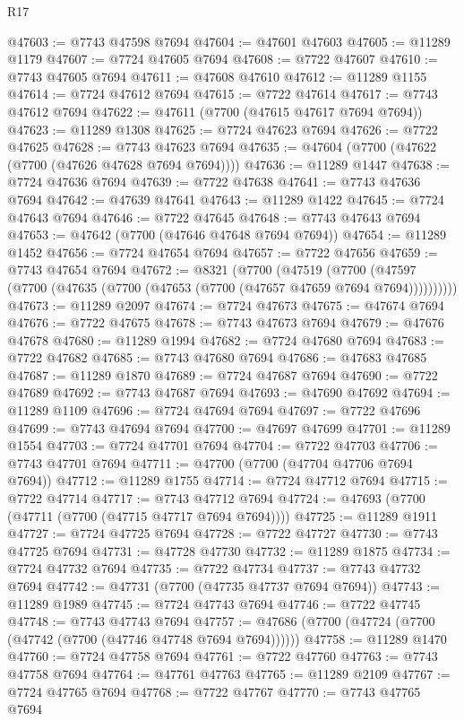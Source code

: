 \begin{lexlean}{R17}
\begin{coremodule}
@47603 := @7743 @47598 @7694
@47604 := @47601 @47603
@47605 := @11289 @1179
@47607 := @7724 @47605 @7694
@47608 := @7722 @47607
@47610 := @7743 @47605 @7694
@47611 := @47608 @47610
@47612 := @11289 @1155
@47614 := @7724 @47612 @7694
@47615 := @7722 @47614
@47617 := @7743 @47612 @7694
@47622 := @47611 (@7700 (@47615 @47617 @7694 @7694))
@47623 := @11289 @1308
@47625 := @7724 @47623 @7694
@47626 := @7722 @47625
@47628 := @7743 @47623 @7694
@47635 := @47604 (@7700 (@47622 (@7700 (@47626 @47628 @7694 @7694))))
@47636 := @11289 @1447
@47638 := @7724 @47636 @7694
@47639 := @7722 @47638
@47641 := @7743 @47636 @7694
@47642 := @47639 @47641
@47643 := @11289 @1422
@47645 := @7724 @47643 @7694
@47646 := @7722 @47645
@47648 := @7743 @47643 @7694
@47653 := @47642 (@7700 (@47646 @47648 @7694 @7694))
@47654 := @11289 @1452
@47656 := @7724 @47654 @7694
@47657 := @7722 @47656
@47659 := @7743 @47654 @7694
@47672 := @8321
    (@7700
      (@47519
        (@7700 (@47597 (@7700 (@47635 (@7700 (@47653 (@7700 (@47657 @47659 @7694 @7694))))))))))
@47673 := @11289 @2097
@47674 := @7724 @47673
@47675 := @47674 @7694
@47676 := @7722 @47675
@47678 := @7743 @47673 @7694
@47679 := @47676 @47678
@47680 := @11289 @1994
@47682 := @7724 @47680 @7694
@47683 := @7722 @47682
@47685 := @7743 @47680 @7694
@47686 := @47683 @47685
@47687 := @11289 @1870
@47689 := @7724 @47687 @7694
@47690 := @7722 @47689
@47692 := @7743 @47687 @7694
@47693 := @47690 @47692
@47694 := @11289 @1109
@47696 := @7724 @47694 @7694
@47697 := @7722 @47696
@47699 := @7743 @47694 @7694
@47700 := @47697 @47699
@47701 := @11289 @1554
@47703 := @7724 @47701 @7694
@47704 := @7722 @47703
@47706 := @7743 @47701 @7694
@47711 := @47700 (@7700 (@47704 @47706 @7694 @7694))
@47712 := @11289 @1755
@47714 := @7724 @47712 @7694
@47715 := @7722 @47714
@47717 := @7743 @47712 @7694
@47724 := @47693 (@7700 (@47711 (@7700 (@47715 @47717 @7694 @7694))))
@47725 := @11289 @1911
@47727 := @7724 @47725 @7694
@47728 := @7722 @47727
@47730 := @7743 @47725 @7694
@47731 := @47728 @47730
@47732 := @11289 @1875
@47734 := @7724 @47732 @7694
@47735 := @7722 @47734
@47737 := @7743 @47732 @7694
@47742 := @47731 (@7700 (@47735 @47737 @7694 @7694))
@47743 := @11289 @1989
@47745 := @7724 @47743 @7694
@47746 := @7722 @47745
@47748 := @7743 @47743 @7694
@47757 := @47686 (@7700 (@47724 (@7700 (@47742 (@7700 (@47746 @47748 @7694 @7694))))))
@47758 := @11289 @1470
@47760 := @7724 @47758 @7694
@47761 := @7722 @47760
@47763 := @7743 @47758 @7694
@47764 := @47761 @47763
@47765 := @11289 @2109
@47767 := @7724 @47765 @7694
@47768 := @7722 @47767
@47770 := @7743 @47765 @7694

\end{coremodule}
\end{lexlean}

